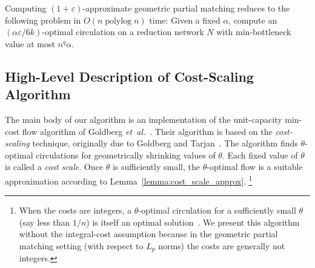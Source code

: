 \documentclass[a4paper,UKenglish]{socg-lipics-v2018}
\def\etal{\emph{et~al.}}
\def\etal{\textit{et~al.}}
\def\polylog{\mathop{\mathrm{polylog}}}
\def\eps{\varepsilon}
\theoremstyle{plain}
\numberwithin{figure}{section}
\def\EMPH#1{\textcolor{BrickRed}{{\emph{#1}}}}
\begin{document}
\begin{lemma}
\label{lemma:cost_scale_approx}
Computing $(1+\eps)$-approximate geometric partial matching reduces to the following problem in $O(n \polylog n)$ time:
Given a fixed $\alpha$, compute an $(\alpha\eps/6k)$-optimal circulation on a
reduction network $N$ with min-bottleneck value at most $n^q \alpha$.
\end{lemma}


\subsection{High-Level Description of Cost-Scaling Algorithm}
\label{SS:cost-scaling}

The main body of our algorithm is an implementation of the unit-capacity
min-cost flow algorithm of Goldberg \etal~\cite{GHKT17}.
Their algorithm is based on the \emph{cost-scaling} technique, originally due to
Goldberg and Tarjan~\cite{GT90}.
The algorithm finds $\theta$-optimal circulations for geometrically shrinking
values of $\theta$.
Each fixed value of $\theta$ is called a \EMPH{cost scale}.
Once $\theta$ is sufficiently small, the $\theta$-optimal flow is a suitable
approximation according to Lemma~\ref{lemma:cost_scale_approx}.%
\footnote{When the costs are integers, a $\theta$-optimal circulation for a sufficiently small $\theta$ (say less than $1/n$) is itself an optimal solution~\cite{GT90,GHKT17}.
We present this algorithm without the integral-cost assumption because in the geometric
partial matching setting (with respect to $L_p$ norms) the costs are generally not integers.}

%
\end{document}
